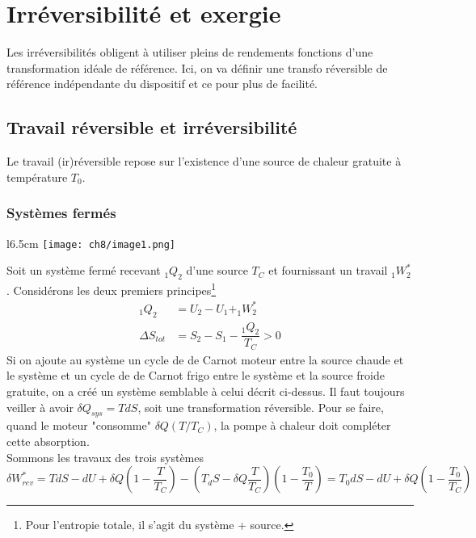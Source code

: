 \chapter{Irréversibilité et exergie}
Les irréversibilités obligent à utiliser pleins de rendements fonctions d'une 
transformation idéale de référence. Ici, on va définir une transfo réversible de 
référence indépendante du dispositif et ce pour plus de facilité.

	\section{Travail réversible et irréversibilité}
	Le travail (ir)réversible repose sur l'existence d'une source de chaleur 
	gratuite à température $T_0$.
	
		\subsection{Systèmes fermés}
			\begin{wrapfigure}[13]{l}{6.5cm}
	\texttt{[image: ch8/image1.png]}
	\end{wrapfigure}
		Soit un système fermé recevant $_1Q_2$ d'une source $T_C$ et fournissant 
		un travail $_1W_2^*$. Considérons les deux premiers principes\footnote{Pour 
		l'entropie totale, il s'agit du système + source.}
		\begin{equation}
		\begin{array}{ll}
		_1Q_2 &= U_2-U_1 + _1W_2^*\\
		\Delta S_{tot} &= S_2-S_1 - \dfrac{_1Q_2}{T_C}>0
		\end{array}
		\end{equation}
		Si on ajoute au système un cycle de de Carnot moteur entre la source chaude et le 
		système et un cycle de de Carnot frigo entre le système et la source froide gratuite, on a 
		créé un système semblable à celui décrit ci-dessus. Il faut toujours veiller 
		à avoir $\delta Q_{sys} = TdS$, soit une transformation réversible. Pour se 
		faire, quand le moteur "consomme" $\delta Q(T/T_C)$, la pompe à chaleur doit 
		compléter cette absorption.\\
		Sommons les travaux des trois systèmes 
		\begin{equation}
		\delta W_{rev}^* = TdS - dU + \delta Q\left(1-\dfrac{T}{T_C}\right)-\left(
		T_dS - \delta Q \dfrac{T}{T_C}\right)\left(1-\dfrac{T_0}{T}\right) = T_0dS - dU + 
		\delta Q\left(1-\dfrac{T_0}{T_C}\right)
		\end{equation}
